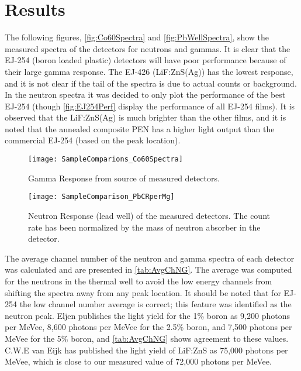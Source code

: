 \documentclass[onecolumn]{IEEEtran}
\begin{document}
\section{Results}
The following figures, \autoref{fig:Co60Spectra} and \autoref{fig:PbWellSpectra}, show the measured spectra of the detectors for neutrons and gammas.
It is clear that the EJ-254 (boron loaded plastic) detectors will have poor performance because of their large gamma response.
The EJ-426 (LiF:ZnS(Ag)) has the lowest response, and it is not clear if the tail of the spectra is due to actual counts or background.
In the neutron spectra it was decided to only plot the performance of the best EJ-254 (though \autoref{fig:EJ254Perf} display the performance of all EJ-254 films).
It is observed that the LiF:ZnS(Ag) is much brighter than the other films, and it is noted that the annealed composite PEN has a higher light output than the commercial EJ-254 (based on the peak location).
\begin{figure}
  \centering
  \texttt{[image: SampleComparions\_Co60Spectra]}
  \caption[Gamma Response of Measured Detectors]{Gamma Response from  source of measured detectors.}
  \label{fig:Co60Spectra}
\end{figure}
\begin{figure}
  \centering
  \texttt{[image: SampleComparison\_PbCRperMg]}
  \caption[Neutron Response of Measured Detectors]{Neutron Response (lead well) of the measured detectors. The count rate has been normalized by the mass of neutron absorber in the detector.}
  \label{fig:PbWellSpectra}
\end{figure}
The average channel number of the neutron and gamma spectra of each detector was calculated and are presented in \autoref{tab:AvgChNG}.
The average was computed for the neutrons in the thermal well to avoid the low energy channels from shifting the spectra away from any peak location.
It should be noted that for EJ-254 the low channel number average is correct; this feature was identified as the neutron peak.
Eljen publishes the light yield for the 1\% boron as 9,200 photons per MeVee, 8,600 photons per MeVee for the 2.5\% boron, and 7,500 photons per MeVee for the 5\% boron, and \autoref{tab:AvgChNG} shows agreement to these values.
C.W.E van Eijk has published the light yield of LiF:ZnS as 75,000 photons per MeVee, which is close to our measured value of 72,000 photons per MeVee.
\end{document}
